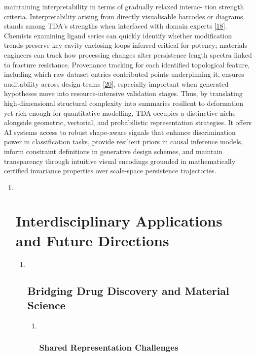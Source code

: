 \documentclass[
]{article}
\begin{document}
maintaining interpretability in terms of gradually relaxed interac- tion
strength criteria. Interpretability arising from directly visualisable
barcodes or diagrams stands among TDA's strengths when interfaced with
domain experts {[}\protect\hyperlink{_bookmark58}{18}{]}. Chemists
examining ligand series can quickly identify whether modification trends
preserve key cavity-enclosing loops inferred critical for potency;
materials engineers can track how processing changes alter persistence
length spectra linked to fracture resistance. Provenance tracking for
each identified topological feature, including which raw dataset entries
contributed points underpinning it, ensures auditability across design
teams {[}\protect\hyperlink{_bookmark60}{20}{]}, especially important
when generated hypotheses move into resource-intensive validation
stages. Thus, by translating high-dimensional structural complexity into
summaries resilient to deformation yet rich enough for quantitative
modelling, TDA occupies a distinctive niche alongside geometric,
vectorial, and probabilistic representation strategies. It offers AI
systems access to robust shape-aware signals that enhance discrimination
power in classification tasks, provide resilient priors in causal
inference models, inform constraint definitions in generative design
schemes, and maintain transparency through intuitive visual encodings
grounded in mathematically certified invariance properties over
scale-space persistence trajectories.

\begin{enumerate}
\def\labelenumi{\arabic{enumi}.}
\setcounter{enumi}{5}
\item ~
  \hypertarget{interdisciplinary-applications-and-future-directions}{%
  \section{Interdisciplinary Applications and Future
  Directions}\label{interdisciplinary-applications-and-future-directions}}

  \begin{enumerate}
  \def\labelenumii{\arabic{enumii}.}
  \item ~
    \hypertarget{bridging-drug-discovery-and-material-science}{%
    \subsection{Bridging Drug Discovery and Material
    Science}\label{bridging-drug-discovery-and-material-science}}

    \begin{enumerate}
    \def\labelenumiii{\arabic{enumiii}.}
    \item ~
      \hypertarget{shared-representation-challenges}{%
      \subsubsection{Shared Representation
      Challenges}\label{shared-representation-challenges}}
    \end{enumerate}
  \end{enumerate}
\end{enumerate}
\end{document}
